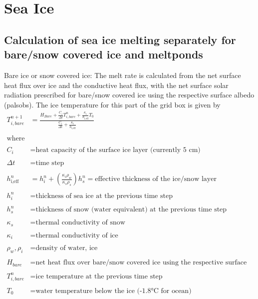 \section{Sea Ice}
\subsection{Calculation of sea ice melting separately for bare/snow covered ice and meltponds}
Bare ice or snow covered ice: The melt rate is calculated from the net surface heat flux over
ice and the conductive heat flux, with the net surface solar radiation prescribed for bare/snow
covered ice using the respective surface albedo (palsobs). The ice temperature for this part
of the grid box is given by
\begin{align}
T_{i,bare}^{n+1}&=\frac{ H_{Bare} + \frac{C_i}{\Delta t} T_{i,bare}^n +\frac{\kappa_i}{h_{\text{i,eff}}} T_0 } {\frac{C_i}{\Delta t}+\frac{\kappa_i}{h_{\text{i,eff}}} } \label{sea_ice_1}\\
\nonumber \\
\text{where}&\nonumber\\
\nonumber \\
C_i & = \text{heat capacity of the surface ice layer (currently 5 cm)} \nonumber \\
\nonumber \\
\Delta t &= \text{time step}\nonumber \\
\nonumber \\
h_{\text{i,eff}}^n & = h_i^n+\left (\frac {\kappa_i \rho_w}{\kappa_s \rho_s}\right )h_s^n =\text{effective thickness of the ice/snow layer} \nonumber \\
\nonumber \\
h_i^n & = \text{thickness of sea ice at the previous time step}\nonumber \\
\nonumber \\
h_s^n & = \text{thickness of snow (water equivalent) at the previous time step}\nonumber \\
\nonumber \\
\kappa_s & = \text{thermal conductivity of snow} \nonumber \\
\nonumber \\
\kappa_i & = \text{thermal conductivity of ice} \nonumber \\
\nonumber \\
\rho_w, \rho_i & =\text{density of water, ice}  \nonumber \\
\nonumber \\
H_{bare} & = \text{net heat flux over bare/snow covered ice using the respective surface albedo} \nonumber \\
\nonumber \\
T_{i,bare}^n & = \text{ice temperature at the previous time step}  \nonumber \\
\nonumber \\
T_0 & = \text{water temperature below the ice (-1.8°C for ocean)} \nonumber
\end{align}
